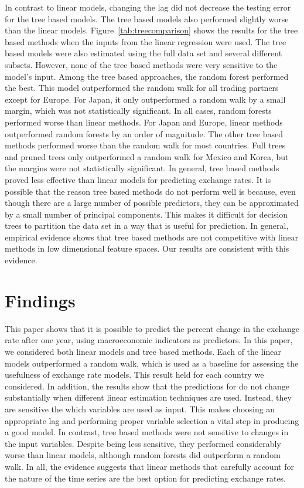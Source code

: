 \documentclass{sig-alternate-05-2015}
\begin{document}
\par{} In contrast to linear models, changing the lag did not decrease the testing error for the tree based models. The tree based models also performed slightly worse than the linear models. Figure~\ref{tab:treecomparison} shows the results for the tree based methods when the inputs from the linear regression were used. The tree based models were also estimated using the full data set and several different subsets. However, none of the tree based methods were very sensitive to the model's input. Among the tree based approaches, the random forest performed the best. This model outperformed the random walk for all trading partners except for Europe. For Japan, it only outperformed a random walk by a small margin, which was not statistically significant. In all cases, random forests performed worse than linear methods. For Japan and Europe, linear methods outperformed random forests by an order of magnitude. The other tree based methods performed worse than the random walk for most countries. Full trees and pruned trees only outperformed a random walk for Mexico and Korea, but the margins were not statistically significant. In general, tree based methods proved less effective than linear models for predicting exchange rates. It is possible that the reason tree based methods do not perform well is because, even though there are a large number of possible predictors, they can be approximated by a small number of principal components. This makes it difficult for decision trees to partition the data set in a way that is useful for prediction. In general, empirical evidence shows that tree based methods are not competitive with linear methods in low dimensional feature spaces. Our results are consistent with this evidence.


\section{Findings}

This paper shows that it is possible to predict the percent change in the exchange rate after one year, using macroeconomic indicators as predictors. In this paper, we considered both linear models and tree based methods. Each of the linear models outperformed a random walk, which is used as a baseline for assessing the usefulness of exchange rate models. This result held for each country we considered. In addition, the results show that the predictions for do not change substantially when different linear estimation techniques are used. Instead, they are sensitive the which variables are used as input. This makes choosing an appropriate lag and performing proper variable selection a vital step in producing a good model. In contrast, tree based methods were not sensitive to changes in the input variables. Despite being less sensitive, they performed considerably worse than linear models, although random forests did outperform a random walk. In all, the evidence suggests that linear methods that carefully account for the nature of the time series are the best option for predicting exchange rates.
\end{document}
